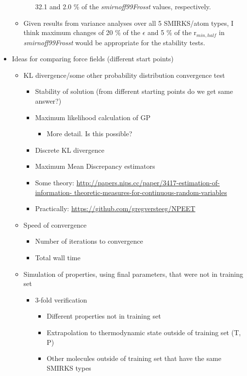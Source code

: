 \documentclass[aps,pre,nofootinbib,superscriptaddress,linenumbers,10pt, draft,tightenlines]{revtex4-1}
\begin{document}
\begin{itemize}
\begin{itemize}
\begin{itemize}
                      32.1 and 2.0 \% of the \textit{smirnoff99Frosst} values, respectively.
            \end{itemize}
            \item Given results from variance analyses over all 5 SMIRKS/atom types, I think
                  maximum changes of 20 \% of the $\epsilon$ and 5 \% of the r$_{min,half}$ in 
                  \textit{smirnoff99Frosst} would be appropriate for the stability tests.
        \end{itemize}
    \item Ideas for comparing force fields (different start points) 
    \begin{itemize}
    	\item KL divergence/some other probability distribution convergence test
        \begin{itemize}
            \item Stability of solution (from different starting points do we get same answer?)
            \item Maximum likelihood calculation of GP
            \begin{itemize}
                \item More detail. Is this possible? 
            \end{itemize}
            \item Discrete KL divergence
            \item Maximum Mean Discrepancy estimators
            \item Some theory: \url{http://papers.nips.cc/paper/3417-estimation-of-information-
                  theoretic-measures-for-continuous-random-variables}
            \item Practically: \url{https://github.com/gregversteeg/NPEET}
        \end{itemize}
    	\item Speed of convergence
        \begin{itemize}
            \item Number of iterations to convergence
            \item Total wall time
        \end{itemize} 
    	\item Simulation of properties, using final parameters, that 
    	      were not in training set
    	\begin{itemize}
    		\item 3-fold verification
    		\begin{itemize}
    			\item Different properties not in training set
    			\item Extrapolation to thermodynamic state outside of training set (T, P)
    			\item Other molecules outside of training set that have the same SMIRKS types
    		\end{itemize}    		
    	\end{itemize} 
    \end{itemize}
\end{itemize}
\end{document}
